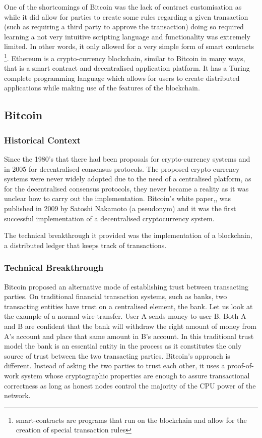 \documentclass[llncsdoc]{llncs}
\begin{document}
One of the shortcomings of Bitcoin was the lack of contract customisation as while it did allow for parties to create some rules regarding a given transaction (such as requiring a third party to approve the transaction) doing so required learning a not very intuitive scripting language and functionality was extremely limited. In other words, it only allowed for a very simple form of smart contracts \footnote{smart-contracts are programs that run on the blockchain and allow for the creation of special transaction rules}. Ethereum is a crypto-currency blockchain, similar to Bitcoin in many ways, that is a smart contract and decentralised application platform. It has a Turing complete programming language which allows for users to create distributed applications while making use of the features of the blockchain.

\subsection{Bitcoin}

\subsubsection{Historical Context}

 Since the 1980's that there had been proposals for crypto-currency systems and in 2005 for decentralised consensus protocols. The proposed crypto-currency systems were never widely adopted due to the need of a centralised platform, as for the decentralised consensus protocols, they never became a reality as it was unclear how to carry out the implementation.
 Bitcoin's white paper,\cite{Anonymous:JOJGrvgg}, was published in 2009 by Satoshi Nakamoto (a pseudonym) and it was the first successful implementation of a decentralised cryptocurrency system.
 
 The technical breakthrough it provided was the implementation of a blockchain, a distributed ledger that keeps track of transactions. 
 \subsubsection{Technical Breakthrough}
 Bitcoin proposed an alternative mode of establishing trust between transacting parties. On traditional financial transaction systems, such as banks, two transacting entities have trust on a centralised element, the bank. Let us look at the example of a normal wire-transfer. User A sends money to user B. Both A and B are confident that the bank will withdraw the right amount of money from A's account and place that same amount in B's account. In this traditional trust model the bank is an essential entity in the process as it constitutes the only source of trust between the two transacting parties. Bitcoin's approach is different. Instead of asking the two parties to trust each other, it uses a proof-of-work system whose cryptographic properties are enough to assure transactional correctness as long as honest nodes control the majority of the CPU power of the network.
 
\end{document}
